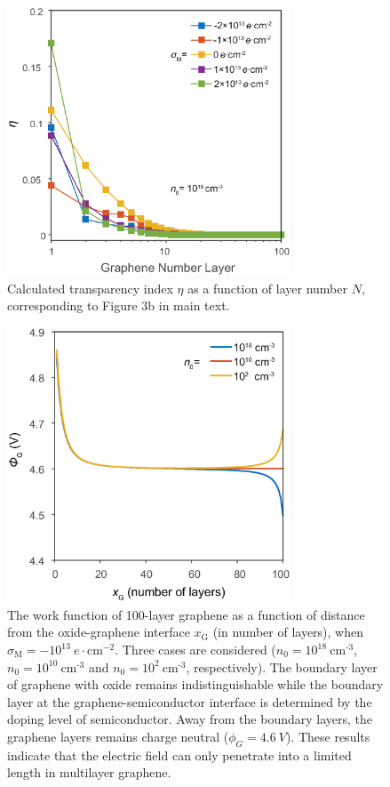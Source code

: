 \documentclass[manuscript=suppinfo]{achemso}
\newcommand*\subs[1]{_{\text{#1}}} %
\newcommand*\sups[1]{^{\text{#1}}} %
\begin{document}
\begin{figure}[htbp]
  \centering
  \includegraphics[width=0.75\textwidth]{img/ML_transparency_S.eps}
  \caption{Calculated transparency index $\eta$ as a function of layer number $N$, corresponding to Figure 3b in main text.}
  \label{fig:ML_trans}
\end{figure}

\begin{figure}[htbp]
  \centering
  \includegraphics[width=0.75\textwidth]{img/ML_boundary.eps}
  \caption{The work function of 100-layer graphene as a function of distance from the oxide-graphene interface $x\subs{G}$ (in number of layers),
  when $\sigma\subs{M}=-10\sups{13}\ e\cdot \mathrm{cm}^{-2}$.
  Three cases are considered ($n_0=10^{18}\ \mathrm{cm}\sups{-3}$, $n_0=10^{10}\ \mathrm{cm}\sups{-3}$ and $n_0=10^{2}\ \mathrm{cm}\sups{-3}$, respectively).
  The boundary layer of graphene with oxide remains indistinguishable while the boundary layer at the graphene-semiconductor interface is determined by the doping level of semiconductor.
  Away from the boundary layers, the graphene layers remains charge neutral ($\phi_{G}=4.6\ V$).
  These results indicate that the electric field can only penetrate into a limited length in multilayer graphene.
  }
  \label{fig:ML_boundary}
\end{figure}
\end{document}
